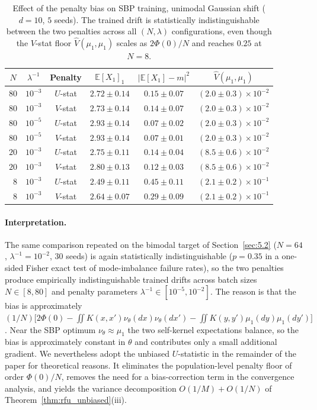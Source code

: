 \documentclass[11pt,leqno]{article}
\theoremstyle{plain}
\theoremstyle{remark}
\theoremstyle{definition}
\numberwithin{equation}{section}
\numberwithin{figure}{section}
\numberwithin{table}{section}
\numberwithin{algorithm}{section}
\newcommand{\EE}{\mathbb{E}}
\begin{document}
\begin{table}[htbp]
\centering
\caption{Effect of the penalty bias on SBP training, unimodal Gaussian shift ($d=10$, $5$ seeds).
The trained drift is statistically indistinguishable between the two penalties across all $(N,\lambda)$ configurations,
even though the $V$-stat floor $\hat{V}(\mu_1,\mu_1)$ scales as $2\Phi(0)/N$ and reaches $0.25$ at $N=8$.}
\label{tab:vstat_penalty}
\begin{small}
\begin{tabular}{cccccc}
\toprule
$N$ & $\lambda^{-1}$ & Penalty & $\EE[X_1]_1$ & $|\EE[X_1]-m|^2$ & $\hat{V}(\mu_1,\mu_1)$ \\
\midrule
$80$ & $10^{-3}$ & $U$-stat & $2.72\pm 0.14$ & $0.15\pm 0.07$ & $(2.0\pm 0.3)\times 10^{-2}$ \\
$80$ & $10^{-3}$ & $V$-stat & $2.73\pm 0.14$ & $0.14\pm 0.07$ & $(2.0\pm 0.3)\times 10^{-2}$ \\
$80$ & $10^{-5}$ & $U$-stat & $2.93\pm 0.14$ & $0.07\pm 0.02$ & $(2.0\pm 0.3)\times 10^{-2}$ \\
$80$ & $10^{-5}$ & $V$-stat & $2.93\pm 0.14$ & $0.07\pm 0.01$ & $(2.0\pm 0.3)\times 10^{-2}$ \\
$20$ & $10^{-3}$ & $U$-stat & $2.75\pm 0.11$ & $0.14\pm 0.04$ & $(8.5\pm 0.6)\times 10^{-2}$ \\
$20$ & $10^{-3}$ & $V$-stat & $2.80\pm 0.13$ & $0.12\pm 0.03$ & $(8.5\pm 0.6)\times 10^{-2}$ \\
$\phantom{0}8$  & $10^{-3}$ & $U$-stat & $2.49\pm 0.11$ & $0.45\pm 0.11$ & $(2.1\pm 0.2)\times 10^{-1}$ \\
$\phantom{0}8$  & $10^{-3}$ & $V$-stat & $2.64\pm 0.07$ & $0.29\pm 0.09$ & $(2.1\pm 0.2)\times 10^{-1}$ \\
\bottomrule
\end{tabular}
\end{small}
\end{table}

\paragraph{Interpretation.}
The same comparison repeated on the bimodal target of Section~\ref{sec:5.2}
($N=64$, $\lambda^{-1}=10^{-2}$, $30$ seeds) is again statistically indistinguishable
($p=0.35$ in a one-sided Fisher exact test of mode-imbalance failure rates),
so the two penalties produce empirically indistinguishable trained drifts
across batch sizes $N\in[8,80]$ and penalty parameters $\lambda^{-1}\in[10^{-5},10^{-2}]$.
The reason is that the bias is approximately
$(1/N)\bigl[2\Phi(0)-\iint K(x,x')\nu_\theta(dx)\nu_\theta(dx')-\iint K(y,y')\mu_1(dy)\mu_1(dy')\bigr]$. 
Near the SBP optimum $\nu_\theta\approx\mu_1$ the two self-kernel expectations balance,
so the bias is approximately constant in $\theta$ and contributes only a small additional gradient.
We nevertheless adopt the unbiased $U$-statistic in the remainder of the paper for theoretical reasons. 
It eliminates the population-level penalty floor of order $\Phi(0)/N$,
removes the need for a bias-correction term in the convergence analysis,
and yields the variance decomposition $O(1/M)+O(1/N)$ of Theorem~\ref{thm:rfu_unbiased}(iii).
\end{document}
